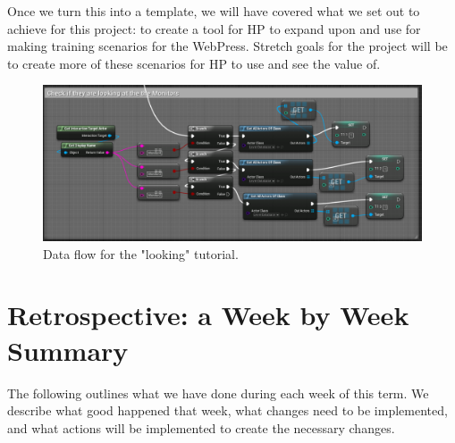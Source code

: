 \documentclass[onecolumn, draftclsnofoot,10pt, compsoc]{IEEEtran}
\begin{document}
Once we turn this into a template, we will have covered what we set out to achieve for this project: to create a tool for HP to expand upon and use for making training scenarios for the WebPress. Stretch goals for the project will be to create more of these scenarios for HP to use and see the value of.

\begin{figure}
    \centering
    \includegraphics[scale=0.55]{looking_tutorial.png}
    \caption{Data flow for the "looking" tutorial.}
    \label{fig:tutorial1}
\end{figure}

\section{Retrospective: a Week by Week Summary}

The following outlines what we have done during each week of this term. We describe what good happened that week, what changes need to be implemented, and what actions will be implemented to create the necessary changes.
\end{document}
